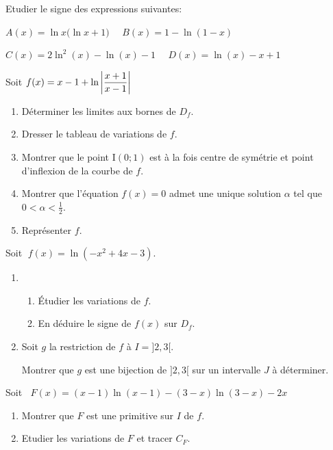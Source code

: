 \begin{exercice}
Etudier le signe des expressions suivantes: 

\medskip
$A(x)  = \ln x\bigl(\ln x+1\bigr)\quad  $  $ B(x) = 1-\ln(1-x) $

\medskip  
$C(x)  =2\ln^2(x) -\ln (x)-1  \quad $  $ D(x)=  \ln(x)-x+1$ 
\end{exercice}


\begin{exercice}
Soit $ f(x)= x-1+ \ln\left\lvert \dfrac{x+1}{x-1} \right\rvert $
\begin{enumerate}
\item Déterminer  les limites aux bornes de  $D_{f}$.
\item Dresser le tableau de variations de $ f. $
\item Montrer que le point I$ (0;1)$ est à la fois centre de symétrie  et  point d'inflexion de la courbe de $ f$. 
\item Montrer que l'équation $ f(x)=0 $  admet une unique solution $ \alpha $ tel que $ 0<  \alpha<\frac{1}{2} $.
\item Représenter $ f. $
\end{enumerate}
\end{exercice}

\begin{exercice}
Soit  $ \; f(x)=\ln(-x^{2}+4x-3) $.
  \begin{enumerate}
\item 
\begin{enumerate}
 \item  Étudier les variations  de $ f$.
 \item En déduire le signe de $ f(x) $ sur $ D_{f} $.  
\end{enumerate}
\item Soit $ g $ la restriction de $ f  $ à  $ I=]2  ,3[ $.

 Montrer que $ g $ est une bijection de $ ]2  ,3[ $  sur un intervalle $ J $ à déterminer.
\end{enumerate}

 Soit $\;\; F(x)=(x-1)\ln (x-1)-(3-x)\ln (3-x)-2x$  
\begin{enumerate}
\item Montrer que $ F $ est une primitive  sur $I $ de $ f $.
\item Etudier les variations de $ F $ et tracer $ C_{F} $.
\end{enumerate}
\end{exercice}




